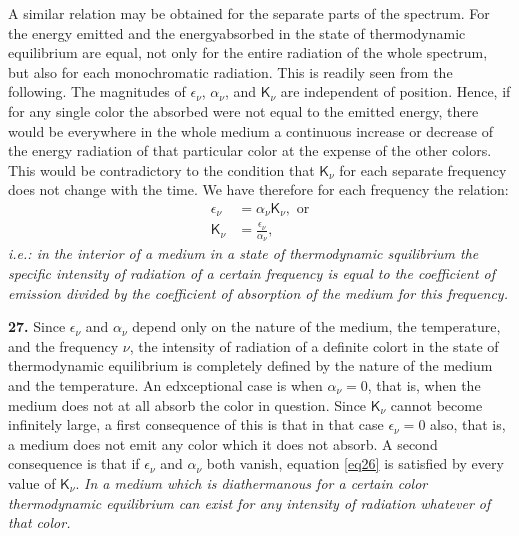 \documentclass[12pt,oneside]{book}
\begin{document}
A similar relation may be obtained for the separate parts of the spectrum. For the energy emitted and the energyabsorbed in the state of thermodynamic equilibrium are equal, not only for the entire radiation of the whole spectrum, but also for each monochromatic radiation. This is readily seen from the following. The magnitudes of $\epsilon_\nu$, $\alpha_\nu$, and $\mathsf{K}_\nu$ are independent of position. Hence, if for any single color the absorbed were not equal to the emitted energy, there would be everywhere in the whole medium a continuous increase or decrease of the energy radiation of that particular color at the expense of the other colors. This would be contradictory to the condition that $\mathsf{K}_\nu$ for each separate frequency does not change with the time. We have therefore for each frequency the relation:
\begin{align}
    \epsilon_\nu&=\alpha_\nu\mathsf{K}_\nu, \text{ or} \label{eq26}\\
    \mathsf{K}_\nu&=\frac{\epsilon_\nu}{\alpha_\nu},
    \label{eq27}
\end{align}   
\textit{i.e.: in the interior of a medium in a state of thermodynamic squilibrium the specific intensity of radiation of a certain frequency is equal to the coefficient of emission divided by the coefficient of absorption of the medium for this frequency.} \par 

\textbf{27.} Since $\epsilon_\nu$ and $\alpha_\nu$ depend only on the nature of the medium, the temperature, and the frequency $\nu$, the intensity of radiation of a definite colort in the state of thermodynamic equilibrium is completely defined by the nature of the medium and the temperature. An edxceptional case is when $\alpha_\nu=0$, that is, when the medium does not at all absorb the color in question. Since $\mathsf{K}_\nu$ cannot become infinitely large, a first consequence of this is that in that case $\epsilon_\nu=0$ also, that is, a medium does not emit any color which it does not absorb. A second consequence is that if $\epsilon_\nu$ and $\alpha_\nu$ both vanish, equation \eqref{eq26} is satisfied by every value of $\mathsf{K}_\nu$. \textit{In a medium which is diathermanous for a certain color thermodynamic equilibrium can exist for any intensity of radiation whatever of that color.} \par 
\end{document}
